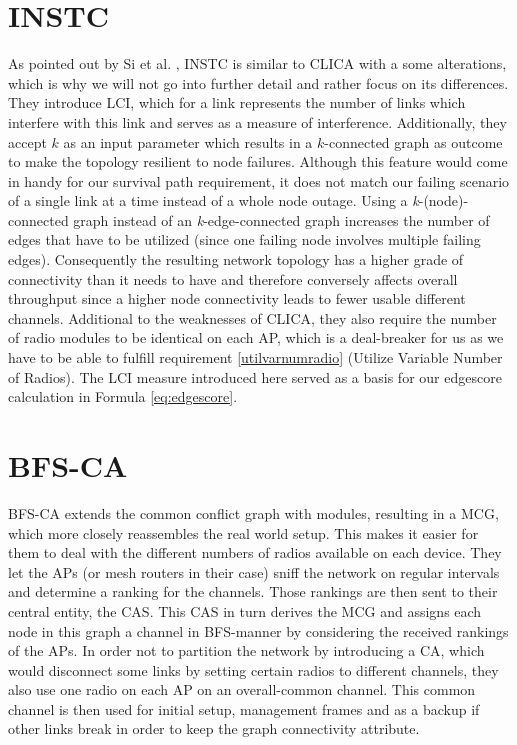   \section{\ac{INSTC}}
    As pointed out by Si et al. \cite{overview_caa}, \ac{INSTC} \cite{INSTC} is similar to \ac{CLICA} \cite{CLICA} with a some alterations, 
    which is why we will not go into further detail and rather focus on its differences. 
    They introduce \ac{LCI}, which for a link represents the number of links which interfere with this link and serves as a measure of interference.
    Additionally, they accept \(k\) as an input parameter which results in a \(k\)-connected graph as outcome to make the topology resilient to node failures.
    Although this feature would come in handy for our survival path requirement,
    it does not match our failing scenario of a single link at a time instead of a whole node outage.
    Using a \textit{k}-(node)-connected graph instead of an \textit{k}-edge-connected graph increases the number of edges that have to be utilized 
    (since one failing node involves multiple failing edges).
    Consequently the resulting network topology has a higher grade of connectivity than it needs to 
    have and therefore conversely affects overall throughput since a higher node connectivity leads to fewer usable different channels. 
    Additional to the weaknesses of \ac{CLICA}, they also require the number of radio modules to be identical on each \ac{AP}, 
    which is a deal-breaker for us as we have to be able to fulfill requirement \ref{utilvarnumradio} (Utilize Variable Number of Radios).
    The \ac{LCI} measure introduced here served as a basis for our edgescore calculation in Formula \ref{eq:edgescore}.
    
  \section{\ac{BFS-CA}}
    \ac{BFS-CA} \cite{BFS-CA} extends the common conflict graph with modules, resulting in a \ac{MCG}, which more closely reassembles the real world setup.
    This makes it easier for them to deal with the different numbers of radios available on each device. 
    They let the APs (or mesh routers in their case) sniff the network on regular intervals and determine a ranking for the channels.
    Those rankings are then sent to their central entity, the \ac{CAS}.
    This \ac{CAS} in turn derives the \ac{MCG} and assigns each node in this graph a channel in \ac{BFS}-manner by considering the received rankings of the APs.
    In order not to partition the network by introducing a \ac{CA}, which would disconnect some links by setting certain radios to different channels,
    they also use one radio on each AP on an overall-common channel.
    This common channel is then used for initial setup, management frames and as a backup if other links break in order to keep the graph connectivity attribute.
    
